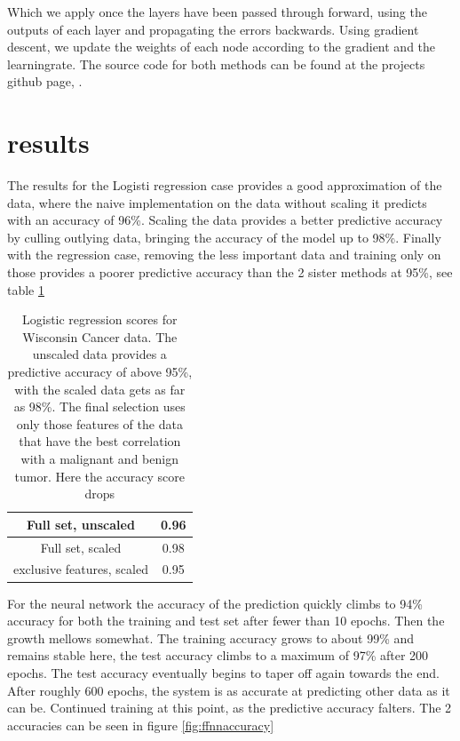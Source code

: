 \documentclass[10pt]{article}
\begin{document}
Which we apply once the layers have been passed through forward, using the
outputs of each layer and propagating the errors backwards. Using gradient
descent, we update the weights of each node according to the gradient and the
learningrate. The source code for both methods can be found at the projects 
github page, \cite{AnnikaGit2020}.


\section{results}

The results for the Logisti regression case provides a good approximation of
the data, where the naive implementation on the data without scaling it
predicts with an accuracy of 96\%. Scaling the data provides a better
predictive accuracy by culling outlying data, bringing the accuracy of the
model up to 98\%.  Finally with the regression case, removing the less
important data and training only on those provides a poorer predictive accuracy
than the 2 sister methods at 95\%, see table \ref{tab:logreg}

\begin{table}
	\centering
	\begin{tabular}{ |c|c| }
		\hline
		Full set, unscaled & 0.96 \\
		\hline
		Full set, scaled & 0.98 \\
		\hline
		exclusive features, scaled & 0.95 \\
		\hline
	\end{tabular}
	\caption{Logistic regression scores for Wisconsin Cancer data. The unscaled
	data provides a predictive accuracy of above 95\%, with the scaled data
	gets as far as 98\%. The final selection uses only those features of the
	data that have the best correlation with a malignant and benign tumor.
	Here the accuracy score drops }
	\label{tab:logreg}
\end{table}

For the neural network the accuracy of the prediction quickly climbs to 94\%
accuracy for both the training and test set after fewer than 10 epochs. Then
the growth mellows somewhat. The training accuracy grows to about 99\% and
remains stable here, the test accuracy climbs to a maximum of 97\% after 200
epochs. The test accuracy eventually begins to taper off again towards the end.
After roughly 600 epochs, the system is as accurate at predicting other data as
it can be. Continued training at this point, as the predictive accuracy
falters. The 2 accuracies can be seen in figure \ref{fig:ffnnaccuracy}
\end{document}
